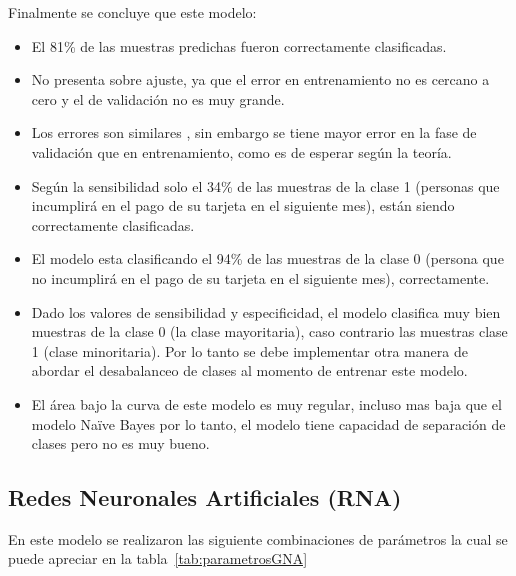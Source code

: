 \documentclass[conference]{IEEEtran}
\begin{document}
Finalmente se concluye que este modelo:
\begin{itemize}
\item El 81\% de las muestras predichas fueron correctamente clasificadas.
\item No presenta sobre ajuste, ya que el error en entrenamiento no es cercano a cero y el de validación no es muy grande.
\item Los errores son similares , sin embargo se tiene mayor error en la fase de validación que en entrenamiento, como es de esperar según la teoría.
\item Según la sensibilidad solo el 34\% de las muestras de la clase 1 (personas que incumplirá en el pago de su tarjeta en el siguiente mes), están siendo correctamente clasificadas.
\item El modelo esta clasificando el 94\% de las muestras de la clase 0 (persona que no incumplirá en el pago de su tarjeta en el siguiente mes), correctamente.
\item Dado los valores de sensibilidad y especificidad, el modelo clasifica muy bien muestras de la clase 0 (la clase mayoritaria), caso contrario las muestras clase 1 (clase minoritaria). Por lo tanto se debe implementar otra manera de abordar el desabalanceo de clases al momento de entrenar este modelo.
\item El área bajo la curva de este modelo es muy regular, incluso mas baja que el modelo Naïve Bayes por lo tanto, el modelo  tiene capacidad de separación de clases pero no es muy bueno.
\end{itemize}
\subsection{Redes Neuronales Artificiales (RNA)}
En este modelo se realizaron las siguiente combinaciones de parámetros la cual se puede apreciar en la tabla~\ref{tab:parametrosGNA}\hfill\\
\end{document}

